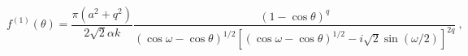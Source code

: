 \begin{equation}
\label{f1}
f^{(1)}(\theta)=\frac{\pi(a^2+q^2)}{2\sqrt2\alpha k}\frac{(1-\cos\theta)^q}
{(\cos\omega-\cos\theta)^{1/2}[(\cos\omega-\cos\theta)^{1/2}-i\sqrt2
\sin(\omega/2)]^{2q}} \ ,
\end{equation}

